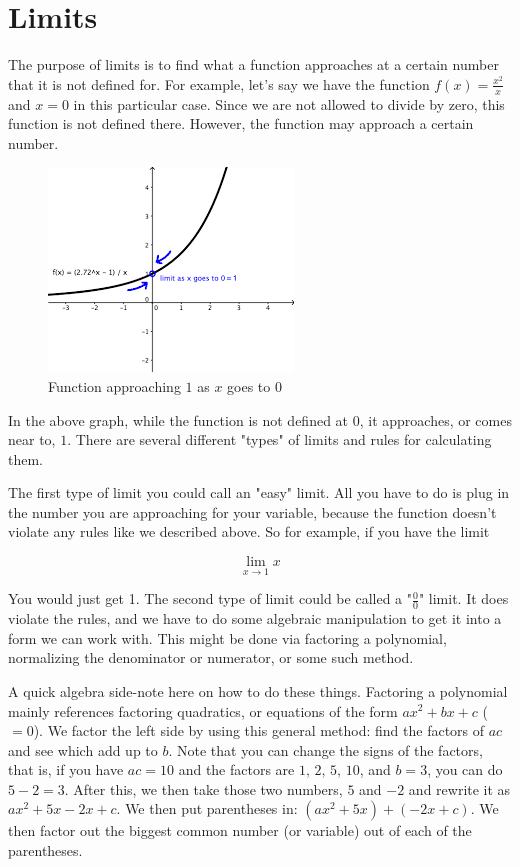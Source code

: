 \documentclass[12pt]{article}
\begin{document}
\section{Limits}

The purpose of limits is to find what a function approaches at a certain number that it is not defined for. For example, let's say we have the function $f(x) = \frac{x^2}{x}$ and $x = 0$ in this particular case. Since we are not allowed to divide by zero, this function is not defined there. However, the function may approach a certain number.

\begin{figure}[H]
\caption{Function approaching $1$ as $x$ goes to $0$}
\includegraphics[scale=0.8]{images.png}
\end{figure}

In the above graph, while the function is not defined at $0$, it approaches, or comes near to, $1$. There are several different "types" of limits and rules for calculating them. 

The first type of limit you could call an "easy" limit. All you have to do is plug in the number you are approaching for your variable, because the function doesn't violate any rules like we described above. So for example, if you have the limit

\begin{equation*}
    \lim\limits_{x\rightarrow 1} x
\end{equation*}

You would just get 1. The second type of limit could be called a "$\frac{0}{0}$" limit. It does violate the rules, and we have to do some algebraic manipulation to get it into a form we can work with. This might be done via factoring a polynomial, normalizing the denominator or numerator, or some such method.

A quick algebra side-note here on how to do these things. Factoring a polynomial mainly references factoring quadratics, or equations of the form $ax^2 + bx + c$ ($=0$). We factor the left side by using this general method: find the factors of $ac$ and see which add up to $b$. Note that you can change the signs of the factors, that is, if you have $ac = 10$ and the factors are $1, \, 2, \, 5, \, 10$, and $b = 3$, you can do $5-2 = 3$. After this, we then take those two numbers, $5$ and $-2$ and rewrite it as $ax^2 + 5x -2x + c$. We then put parentheses in: $(ax^2 + 5x) + (-2x + c)$. We then factor out the biggest common number (or variable) out of each of the parentheses.
\end{document}
